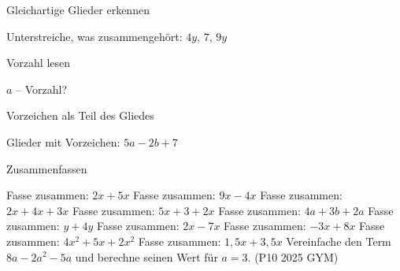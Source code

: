 \setcounter{aufgabe}{10}

\begin{aufgabe}{Gleichartige Glieder erkennen}
\begin{teile}
\teil Unterstreiche, was zusammengehört: $4y$, $7$, $9y$
\end{teile}
\end{aufgabe}

\begin{aufgabe}{Vorzahl lesen}
\begin{teile}
\teil $a$ – Vorzahl?
\end{teile}
\end{aufgabe}

\begin{aufgabe}{Vorzeichen als Teil des Gliedes}
\begin{teile}
\teil Glieder mit Vorzeichen: $5a - 2b + 7$
\end{teile}
\end{aufgabe}

\begin{aufgabe}{Zusammenfassen}
\begin{teile}
\teil Fasse zusammen: $2x + 5x$ \leerfeld
\teil Fasse zusammen: $9x - 4x$ \leerfeld
\teil Fasse zusammen: $2x + 4x + 3x$ \leerfeld
\teil Fasse zusammen: $5x + 3 + 2x$ \leerfeld
\teil Fasse zusammen: $4a + 3b + 2a$ \leerfeld
\teil Fasse zusammen: $y + 4y$ \leerfeld
\teil Fasse zusammen: $2x - 7x$ \leerfeld
\teil Fasse zusammen: $-3x + 8x$ \leerfeld
\teil Fasse zusammen: $4x^2 + 5x + 2x^2$ \leerfeld
\teil Fasse zusammen: $1{,}5x + 3{,}5x$ \leerfeld
\teil Vereinfache den Term $8a - 2a^2 - 5a$ und berechne seinen Wert für $a = 3$. \hfill (P10 2025 GYM)
\end{teile}
\end{aufgabe}


